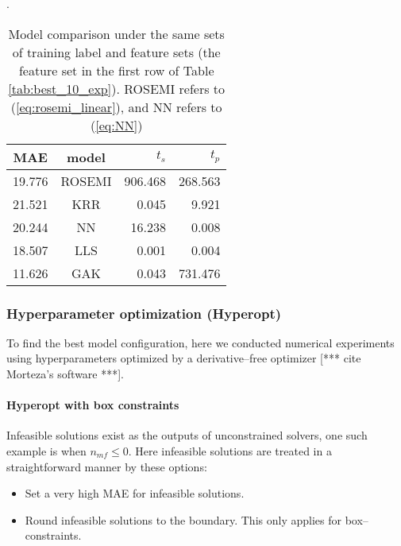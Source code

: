 \documentclass[12pt]{article}
\def\att{                    %
        \marginpar[ \hspace*{\fill} \raisebox{-0.2em}{\rule{2mm}{1.2em}} ]
        {\raisebox{-0.2em}{\rule{2mm}{1.2em}} }
        }
\def\at#1{[*** \att #1 ***]}  %
\begin{document}
\begin{table}[H]
	\centering
	\caption{Model comparison under the same sets of training label and feature sets (the feature set in the first row of Table \ref{tab:best_10_exp}). ROSEMI refers to (\ref{eq:rosemi_linear}), and NN refers to (\ref{eq:NN})}.
	\begin{tabular}{|c|c|r|r|}
		\hline
		\textbf{MAE}	& \textbf{model}	& $t_s$	& $t_p$	\\ \hline
		19.776	& ROSEMI	& 906.468	& 268.563	\\ \hline
		21.521	& KRR	& 0.045	& 9.921	\\ \hline
		20.244	& NN	& 16.238	& 0.008	\\ \hline
		18.507	& LLS	& 0.001	& 0.004	\\ \hline
		11.626	& GAK	& 0.043	& 731.476	\\ \hline
	\end{tabular}
	\label{tab:model_comparison}
\end{table}


\subsubsection{Hyperparameter optimization (Hyperopt)}
To find the best model configuration, here we conducted numerical experiments using hyperparameters optimized by a derivative--free optimizer \at{cite Morteza's software}. 
\paragraph{Hyperopt with box constraints}
Infeasible solutions exist as the outputs of unconstrained solvers, one such example is when $n_{mf} \leq 0$. Here infeasible solutions are treated in a straightforward manner by these options:
\begin{itemize}
	\item Set a very high MAE for infeasible solutions.
	\item Round infeasible solutions to the boundary. This only applies for box--constraints.
\end{itemize}
\end{document}
